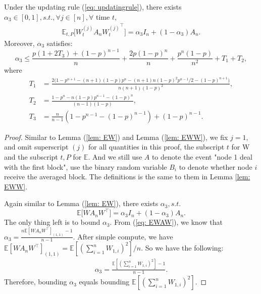\begin{lemma} \label{lem: EWAW}
	Under the updating rule (\ref{eq: updatingrule}), there exists $\alpha_3\in [0,1], s.t.,  \forall j\in [n], \forall$ time $t$,
	\begin{align*}
		\mathbb{E}_{t,P} \Big[W_t^{(j)}A_n{W_t^{(j)}}^{\top}\Big] = \alpha_3 I_n + (1-\alpha_3)A_n.
	\end{align*}
	Moreover, $\alpha_3$ satisfies: 
	\begin{equation*}
		\alpha_3 \le \frac{p(1+2T_3) + (1-p)^{n-1}}{n} + \frac{2p(1-p)^n}{n} + \frac{p^n(1-p)}{n^2} + T_1 + T_2,
	\end{equation*}
	where
	\begin{align*}
		T_1 &= \frac{2\big(1-p^{n+1}-(n+1)(1-p)p^n - (n+1)n(1-p)^2p^{n-1}/2 - (1-p)^{n+1}\big)}{n(n+1)(1-p)^2},\\
		T_2 &=\frac{1-p^n-n(1-p)p^{n-1}-(1-p)^n}{(n-1)(1-p)},\\
		T_3 &= \frac{n}{n-1}\left(1-p^{n-1} - (1-p)^{n-1}\right) + (1-p)^{n-1}.				
	\end{align*}
\begin{proof}
Similar to Lemma (\ref{lem: EW}) and Lemma (\ref{lem: EWW}), we fix $j=1$, and omit superscript $(j)$ for all quantities in this proof, the subscript $t$ for W and the subscript $t,P$ for $\mathbb{E}$. And we still use $A$ to denote the event "node 1 deal with the first block", use the binary random variable $B_i$ to denote whether node $i$ receive the averaged block. The definitions is the same to them in Lemma \ref{lem: EWW}.  

Again similar to Lemma (\ref{lem: EW}), there exists $\alpha_3, s.t.$
\begin{equation} \label{eq: EWAW}
	\mathbb{E} \big[WA_nW^{\top}\big] = \alpha_3I_n + (1-\alpha_3)A_n.
\end{equation}
The only thing left is to bound $\alpha_3$. From (\ref{eq: EWAW}), we know that $\alpha_3 = \frac{n\mathbb{E}[WA_nW^{\top}]_{(1,1)}-1}{n-1}$. After simple compute, we have $\mathbb{E}[WA_nW^{\top}]_{(1,1)} =  \mathbb{E} \left[\left(\sum\limits_{i=1}^n W_{1,i}\right)^2\right]/n$. So we have the following:
\begin{align*}
	\alpha_3 = \frac{\mathbb{E} \left[\left(\sum\limits_{i=1}^n W_{1,i}\right)^2\right]-1}{n-1}.
\end{align*}
Therefore, bounding $\alpha_3$ equals bounding $\mathbb{E} \left[\left(\sum\limits_{i=1}^n W_{1,i}\right)^2\right]$.


\end{proof}
\end{lemma}
